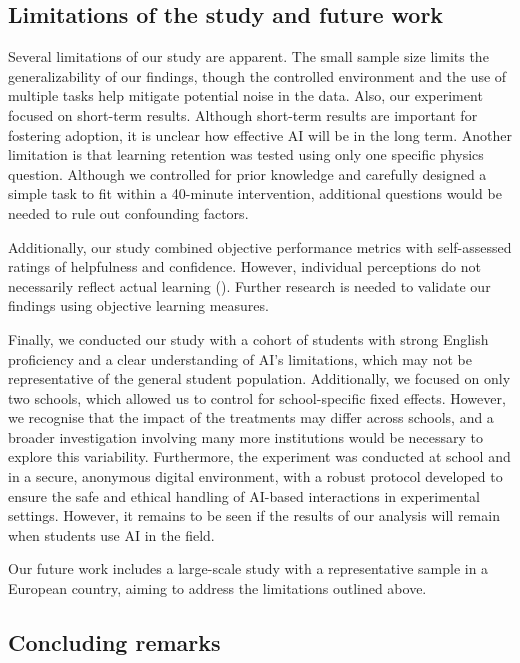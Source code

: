 \documentclass[
  11pt,
]{article}
\begin{document}
\subsection{Limitations of the study and future work}\label{limitations-of-the-study-and-future-work}

Several limitations of our study are apparent. The small sample size limits the generalizability of our findings, though the controlled environment and the use of multiple tasks help mitigate potential noise in the data. Also, our experiment focused on short-term results. Although short-term results are important for fostering adoption, it is unclear how effective AI will be in the long term. Another limitation is that learning retention was tested using only one specific physics question. Although we controlled for prior knowledge and carefully designed a simple task to fit within a 40-minute intervention, additional questions would be needed to rule out confounding factors.

Additionally, our study combined objective performance metrics with self-assessed ratings of helpfulness and confidence. However, individual perceptions do not necessarily reflect actual learning (). Further research is needed to validate our findings using objective learning measures.

Finally, we conducted our study with a cohort of students with strong English proficiency and a clear understanding of AI's limitations, which may not be representative of the general student population. Additionally, we focused on only two schools, which allowed us to control for school-specific fixed effects. However, we recognise that the impact of the treatments may differ across schools, and a broader investigation involving many more institutions would be necessary to explore this variability. Furthermore, the experiment was conducted at school and in a secure, anonymous digital environment, with a robust protocol developed to ensure the safe and ethical handling of AI-based interactions in experimental settings. However, it remains to be seen if the results of our analysis will remain when students use AI in the field.

Our future work includes a large-scale study with a representative sample in a European country, aiming to address the limitations outlined above.

\subsection{Concluding remarks}\label{concluding-remarks}
\end{document}
